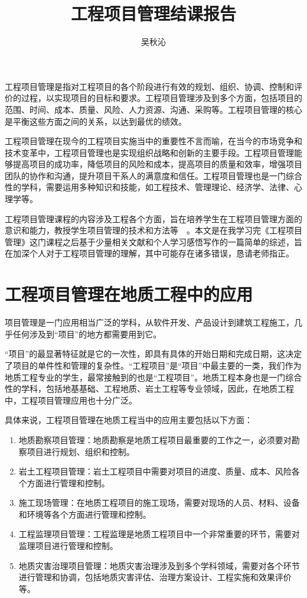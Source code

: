 


	
	\title{\textbf{工程项目管理结课报告}}
	\author{吴秋沁}
	\maketitle %
	
	工程项目管理是指对工程项目的各个阶段进行有效的规划、组织、协调、控制和评价的过程，以实现项目的目标和要求。工程项目管理涉及到多个方面，包括项目的范围、时间、成本、质量、风险、人力资源、沟通、采购等。工程项目管理的核心是平衡这些方面之间的关系，以达到最优的绩效。
	
	工程项目管理在现今的工程项目实施当中的重要性不言而喻，在当今的市场竞争和技术变革中，工程项目管理也是实现组织战略和创新的主要手段。工程项目管理能够提高项目的成功率，降低项目的风险和成本，提高项目的质量和效率，增强项目团队的协作和沟通，提升项目干系人的满意度和信任。工程项目管理也是一门综合性的学科，需要运用多种知识和技能，如工程技术、管理理论、经济学、法律、心理学等。
	
	工程项目管理课程的内容涉及工程各个方面，旨在培养学生在工程项目管理方面的意识和能力，教授学生项目管理的技术和方法等~\cite{LiuMengYingYiGongChengAnLiWeiYinDaoDeGongChengXiangMuGuanLiKeChengGaiGeJianSheTanSuo2023}~。本文是在我学习完《工程项目管理》这门课程之后基于少量相关文献和个人学习感悟写作的一篇简单的综述，旨在加深个人对于工程项目管理的理解，其中可能存在诸多错误，恳请老师指正。
	
	\section{工程项目管理在地质工程中的应用}
	
	项目管理是一门应用相当广泛的学科，从软件开发、产品设计到建筑工程施工，几乎任何涉及到“项目”的地方都需要用到它。
	
	“项目”的最显著特征就是它的一次性，即具有具体的开始日期和完成日期，这决定了项目的单件性和管理的复杂性。“工程项目”是“项目”中最主要的一类，我们作为地质工程专业的学生，最常接触到的也是“工程项目”。地质工程本身也是一门综合性的学科，包括地基基础、工程地质、岩土工程等专业领域，因此，在地质工程中，工程项目管理应用也十分广泛。
	
	具体来说，工程项目管理在地质工程当中的应用主要包括以下方面：
	
	\begin{enumerate}
		\item 地质勘察项目管理：地质勘察是地质工程项目最重要的工作之一，必须要对勘察项目进行规划、组织和控制。
		\item 岩土工程项目管理：岩土工程项目中需要对项目的进度、质量、成本、风险各个方面进行管理和控制。
		\item 施工现场管理：在地质工程项目的施工现场，需要对现场的人员、材料、设备和环境等各个方面进行管理和控制。
		\item 工程监理项目管理：工程监理是地质工程项目中一个非常重要的环节，需要对监理项目进行管理和控制。
		\item 地质灾害治理项目管理：地质灾害治理涉及到多个学科领域，需要对各个环节进行管理和协调，包括地质灾害评估、治理方案设计、工程实施和效果评价等。
	\end{enumerate}
	
